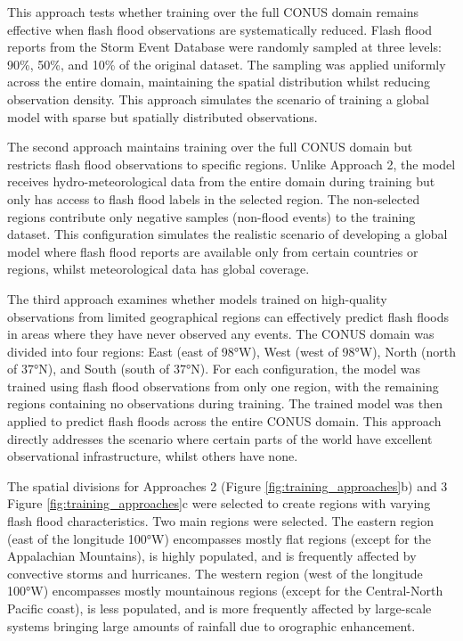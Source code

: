 This  approach tests whether training over the full CONUS domain remains effective when flash flood observations are systematically reduced. Flash flood reports from the Storm Event Database were randomly sampled at three levels: 90\%, 50\%, and 10\% of the original dataset. The sampling was applied uniformly across the entire domain, maintaining the spatial distribution whilst reducing observation density. This approach simulates the scenario of training a global model with sparse but spatially distributed observations.

The  second approach maintains training over the full CONUS domain but restricts flash flood observations to specific regions. Unlike Approach 2, the model receives hydro-meteorological data from the entire domain during training but only has access to flash flood labels in the selected region. The non-selected regions contribute only negative samples (non-flood events) to the training dataset. This configuration simulates the realistic scenario of developing a global model where flash flood reports are available only from certain countries or regions, whilst meteorological data has global coverage.

The  third approach examines whether models trained on high-quality observations from limited geographical regions can effectively predict flash floods in areas where they have never observed any events. The CONUS domain was divided into four regions: East (east of 98°W), West (west of 98°W), North (north of 37°N), and South (south of 37°N). For each configuration, the model was trained using flash flood observations from only one region, with the remaining regions containing no observations during training. The trained model was then applied to predict flash floods across the entire CONUS domain. This approach directly addresses the scenario where certain parts of the world have excellent observational infrastructure, whilst others have none.

The spatial divisions for Approaches 2 (Figure \ref{fig:training_approaches}b) and 3 Figure \ref{fig:training_approaches}c were selected to create regions with varying flash flood characteristics. Two main regions were selected. The eastern region (east of the longitude 100°W) encompasses mostly flat regions (except for the Appalachian Mountains), is highly populated, and is frequently affected by convective storms and hurricanes. The western region (west of the longitude 100°W) encompasses mostly mountainous regions (except for the Central-North Pacific coast), is less populated, and is more frequently affected by large-scale systems bringing large amounts of rainfall due to orographic enhancement.

